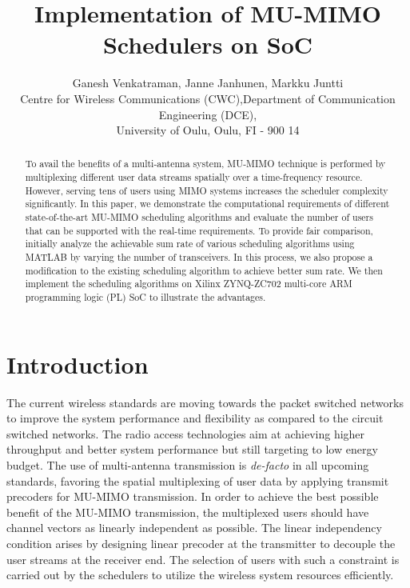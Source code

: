 \documentclass[conference,letterpaper,10pt]{./../../IEEE/IEEEtran}
\begin{document}
\title{Implementation of MU-MIMO Schedulers on SoC}

\author{\begin{tabular}{cc}
\multicolumn{2}{c}{Ganesh Venkatraman, Janne Janhunen, Markku Juntti}\\
Centre for Wireless Communications (CWC), & Department of Communication Engineering (DCE), \\
\multicolumn{2}{c}{University of Oulu, Oulu, FI - 900 14}\\
\end{tabular}}

\maketitle
{}

\begin{abstract}
To avail the benefits of a multi-antenna system, \ac{MU-MIMO} technique is performed by multiplexing different user data streams spatially over a time-frequency resource. However, serving tens of users using \ac{MIMO} systems increases the scheduler complexity significantly. In this paper, we demonstrate the computational requirements of different state-of-the-art \ac{MU-MIMO} scheduling algorithms and evaluate the number of users that can be supported with the real-time requirements. To provide fair comparison, initially analyze the achievable sum rate of various scheduling algorithms using MATLAB by varying the number of transceivers. In this process, we also propose a modification to the existing scheduling algorithm to achieve better sum rate. We then implement the scheduling algorithms on Xilinx ZYNQ-ZC702 multi-core ARM programming logic (PL) \ac{SoC} to illustrate the advantages.
\end{abstract}

\acresetall
{}
\section{Introduction}
The current wireless standards are moving towards the packet switched networks to improve the system performance and flexibility as compared to the circuit switched networks. The radio access technologies aim at achieving higher throughput and better system performance but still targeting to low energy budget. The use of multi-antenna transmission is \textit{de-facto} in all upcoming standards, favoring the spatial multiplexing of user data by applying transmit precoders for \ac{MU-MIMO} transmission. In order to achieve the best possible benefit of the \ac{MU-MIMO} transmission, the multiplexed users should have channel vectors as linearly independent as possible. The linear independency condition arises by designing linear precoder at the transmitter to decouple the user streams at the receiver end. The selection of users with such a constraint is carried out by the schedulers to utilize the wireless system resources efficiently.
\end{document}
